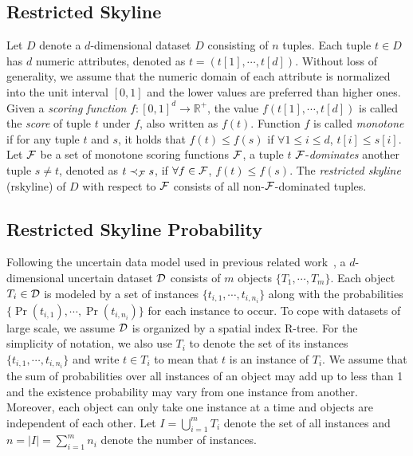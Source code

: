 \subsection{Restricted Skyline}

Let $D$ denote a $d$-dimensional dataset $D$ consisting of $n$ tuples.
Each tuple $t \in D$ has $d$ numeric attributes, denoted as $t = (t[1], \cdots, t[d])$.
Without loss of generality, we assume that the numeric domain of each attribute is normalized into the unit interval $[0, 1]$ and the lower values are preferred than higher ones.
Given a \textit{scoring function} $f : [0, 1]^d \to \mathbb{R}^+$, the value $f(t[1], \cdots, t[d])$ is called the \textit{score} of tuple $t$ under $f$, also written as $f(t)$.
Function $f$ is called \textit{monotone} if for any tuple $t$ and $s$, it holds that $f(t) \le f(s)$ if $\forall 1 \le i \le d$, $t[i] \le s[i]$.
Let $\mathcal{F}$ be a set of monotone scoring functions $\mathcal{F}$, a tuple $t$ $\mathcal{F}$-\textit{dominates} another tuple $s \ne t$, denoted as $t \prec_{\mathcal{F}} s$, if $\forall f \in \mathcal{F}$, $f(t) \le f(s)$.
The \textit{restricted skyline} (rskyline) of $D$ with respect to $\mathcal{F}$ consists of all non-$\mathcal{F}$-dominated tuples.

\subsection{Restricted Skyline Probability}

Following the uncertain data model used in previous related work~\cite{DBLP:conf/pods/AtallahQ09}, a $d$-dimensional uncertain dataset $\mathcal{D}$ consists of $m$ objects $\{T_1, \cdots, T_m\}$.
Each object $T_i \in \mathcal{D}$ is modeled by a set of instances $\{t_{i,1}, \cdots, t_{i, n_i}\}$ along with the probabilities $\{\Pr(t_{i, 1}), \cdots, \Pr(t_{i, n_i})\}$ for each instance to occur.
To cope with datasets of large scale, we assume $\mathcal{D}$ is organized by a spatial index R-tree.
For the simplicity of notation, we also use $T_i$ to denote the set of its instances $\{t_{i, 1}, \cdots, t_{i, n_i}\}$ and write $t \in T_i$ to mean that $t$ is an instance of $T_i$.
We assume that the sum of probabilities over all instances of an object may add up to less than 1 and the existence probability may vary from one instance from another.
Moreover, each object can only take one instance at a time and objects are independent of each other.
Let $I = \bigcup_{i = 1}^m T_i$ denote the set of all instances and $n = |I| = \sum_{i = 1}^m n_i$ denote the number of instances.

